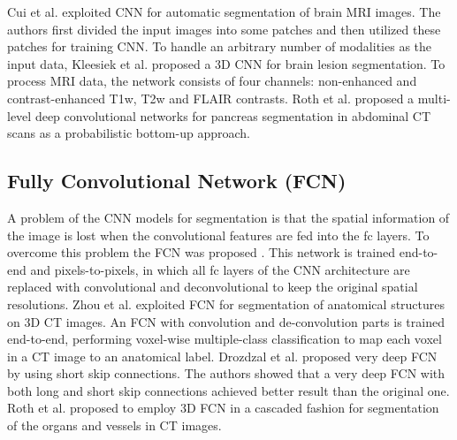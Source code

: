 \documentclass[journal]{IEEEtran}
\begin{document}
Cui et al. \cite{cui2016} exploited CNN for automatic segmentation of brain MRI images. The authors first divided the input images into some patches and then utilized these patches for training CNN. To handle an arbitrary number of modalities as the input data, Kleesiek et al. \cite{kleesiek2016} proposed a 3D CNN for brain lesion segmentation. To process MRI data, the network consists of four channels: non-enhanced and contrast-enhanced T1w, T2w and FLAIR contrasts. Roth et al. \cite{roth2015deeporgan} proposed a multi-level deep convolutional networks for pancreas segmentation in abdominal CT scans as a probabilistic bottom-up approach.


\subsection{Fully Convolutional Network (FCN)}
A problem of the CNN models for segmentation is that the spatial information of the image is lost when the convolutional features are fed into the fc layers. To overcome this problem the FCN was proposed \cite{long2015fully}. This network is trained end-to-end and pixels-to-pixels, in which all fc layers of the CNN architecture are replaced with convolutional and deconvolutional to keep the original spatial resolutions. Zhou et al. \cite{zhou2016three} exploited FCN for segmentation of anatomical structures on 3D CT images. An FCN with convolution and de-convolution parts is trained end-to-end, performing voxel-wise multiple-class classification to map each voxel in a CT image to an anatomical label. Drozdzal et al. \cite{drozdzal2016} proposed very deep FCN by using short skip connections. The authors showed that a very deep FCN with both long and short skip connections achieved better result than the original one.
Roth et al. \cite{roth2018application} proposed to employ 3D FCN in a cascaded fashion for segmentation of the organs and vessels in CT images.
\end{document}
